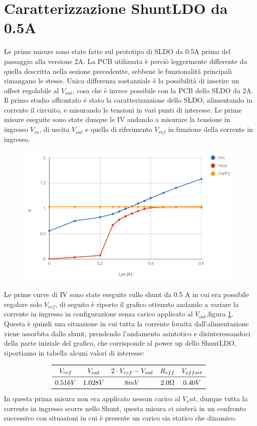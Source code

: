 \section{Caratterizzazione ShuntLDO da 0.5A}
Le prime misure sono state fatte sul prototipo di SLDO da 0.5A prima del passaggio alla versione 2A. La PCB utilizzata è perciò leggermente differente da quella descritta nella sezione precedentte, sebbene le funzionalità principali rimangano le stesse. Unica differenza sostanziale è la possibilità di inserire un offset regolabile al $V_{out}$, cosa che è invece possibile con la PCB dello SLDO da 2A.
Il primo studio affrontato è stato la caratterizzazione dello SLDO, alimentando in corrente il circuito, e misurando le tensioni in vari punti di interesse. Le prime misure eseguite sono state dunque le IV andando a misurare la tensione in ingresso $V_{in}$, di uscita $V_{out}$ e quella di riferimento $V_{ref}$ in funzione della corrente in ingresso.
\begin{figure}
\centering
\includegraphics[scale=.5]{Immagini/provaSLDO5}
\caption{}
\label{provaSLDO5}
\end{figure}

Le prime curve di IV sono state eseguite sullo shunt da 0.5 A in cui era possibile regolare solo $V_{ref}$, di seguito è riporto il grafico ottenuto andando a variare la corrente in ingresso in configurazione senza carico applicato al $V_{out}$,figura \ref{provaSLDO5}. Questa è quindi una situazione in cui tutta la corrente fornita dall'alimentazione viene assorbita dallo shunt,  prendendo l'andamento asintotico e disinteressandoci della parte iniziale del grafico, che corrisponde al power up dello ShuntLDO, riportiamo in tabella alcuni valori di interesse: 

\[
\begin{array}{ccccc}

\toprule
V_{ref} & V_{out} & 2 \cdot V_{ref}- V_{out} & R_{eff} & V_{offset} \\

\midrule

0.516 V & 1.028 V & 8 mV & 2.0 \Omega & 0.40 V \\

\bottomrule
\end{array}
\]
In questa prima misura non era applicato nessun carico al $V_out$, dunque tutta la corrente in ingresso scorre nello Shunt, questa misura ci aiuterà in un confronto successivo con situazioni in cui è presente un carico sia statico che dinamico. 

